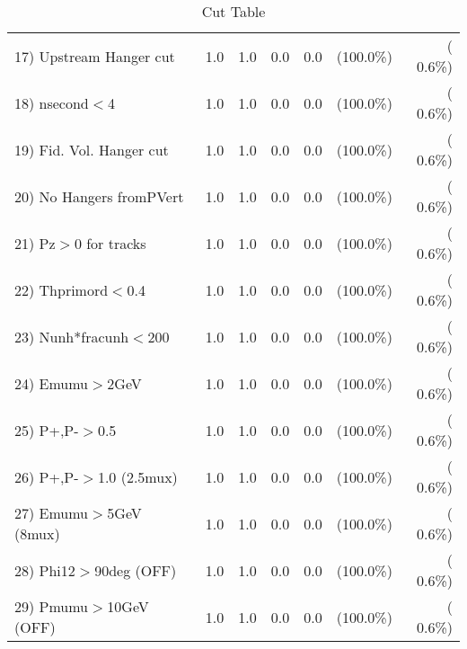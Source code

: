 \begin{table}[h!]
\begin{tabular}{||l||r|r|r|r|r|r||}
 17) Upstream Hanger cut  &          1.0 &          1.0 &          0.0 &          0.0 & (100.0\%) & (  0.6\%) \\
 18) nsecond$<$4          &          1.0 &          1.0 &          0.0 &          0.0 & (100.0\%) & (  0.6\%) \\
 19) Fid. Vol. Hanger cut &          1.0 &          1.0 &          0.0 &          0.0 & (100.0\%) & (  0.6\%) \\
 20) No Hangers fromPVert &          1.0 &          1.0 &          0.0 &          0.0 & (100.0\%) & (  0.6\%) \\
 21) Pz$>$0 for tracks    &          1.0 &          1.0 &          0.0 &          0.0 & (100.0\%) & (  0.6\%) \\
 22) Thprimord$<$0.4      &          1.0 &          1.0 &          0.0 &          0.0 & (100.0\%) & (  0.6\%) \\
 23) Nunh*fracunh$<$200   &          1.0 &          1.0 &          0.0 &          0.0 & (100.0\%) & (  0.6\%) \\
 24) Emumu$>$2GeV         &          1.0 &          1.0 &          0.0 &          0.0 & (100.0\%) & (  0.6\%) \\
 25) P+,P-$>$0.5          &          1.0 &          1.0 &          0.0 &          0.0 & (100.0\%) & (  0.6\%) \\
 26) P+,P-$>$1.0 (2.5mux) &          1.0 &          1.0 &          0.0 &          0.0 & (100.0\%) & (  0.6\%) \\
 27) Emumu$>$5GeV  (8mux) &          1.0 &          1.0 &          0.0 &          0.0 & (100.0\%) & (  0.6\%) \\
 28) Phi12$>$90deg  (OFF) &          1.0 &          1.0 &          0.0 &          0.0 & (100.0\%) & (  0.6\%) \\
 29) Pmumu$>$10GeV  (OFF) &          1.0 &          1.0 &          0.0 &          0.0 & (100.0\%) & (  0.6\%) \\
 \hline
 \hline
 \end{tabular}
 \caption{Cut Table           }
 \label{tab-cutcohjpsi-mumu_cohphi0}
 \end{table}
